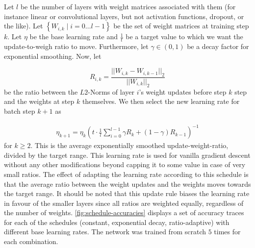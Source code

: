 Let $l$ be the number of layers with weight matrices associated with them (for
instance linear or convolutional layers, but not activation functions, dropout,
or the like). Let $\left\{W_{i,k} \mid i = 0 \ldots l - 1\right\}$ be the set of weight
matrices at training step $k$.  Let $\eta$ be the base learning rate and
$\frac{1}{t}$ be a target value to which we want the update-to-weigh ratio to
move. Furthermore, let $\gamma \in (0, 1)$ be a decay factor for exponential
smoothing.  Now, let

\begin{equation}
    R_{i,k} = \frac{||W_{i,k} - W_{i,k-1}||_2}{||W_{i,k}||_2}
\end{equation}
be the ratio between the $L2$-Norms of layer $i$'s weight updates before step $k$ step
and the weights at step $k$ themselves.  We then select the new learning rate
for batch step $k+1$ as

\begin{align}
    \eta_{k+1}   = \eta_{k}
                   \left(
                   t \cdot \frac{1}{l}
                   \sum_{i=0}^{l-1} \gamma R_k + (1 - \gamma) R_{k-1}
                   \right)^{-1}
\end{align}
for $k \ge 2$.  This is the average exponentially smoothed update-weight-ratio,
divided by the target range. This learning rate is used for vanilla gradient
descent without any other modifications beyond capping it to some value in case
of very small ratios. The effect of adapting the learning rate according to this
schedule is that the average ratio between the weight updates and the weights
moves towards the target range.  It should be noted that this update rule biases
the learning rate in favour of the smaller layers since all ratios are weighted
equally, regardless of the number of weights.
\cref{fig:schedule-accuracies} displays a set of accuracy traces for each of the
schedules (constant, exponential decay, ratio-adaptive) with different base
learning rates. The network was trained from scratch $5$ times for each combination.

